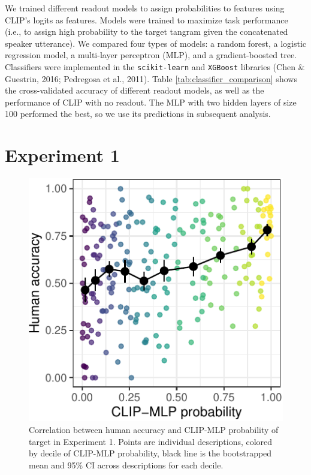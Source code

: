 \documentclass[10pt, letterpaper]{article}
\begin{document}
We trained different readout models to assign probabilities to features
using CLIP's logits as features. Models were trained to maximize task
performance (i.e., to assign high probability to the target tangram
given the concatenated speaker utterance). We compared four types of
models: a random forest, a logistic regression model, a multi-layer
perceptron (MLP), and a gradient-boosted tree. Classifiers were
implemented in the \texttt{scikit-learn} and \texttt{XGBoost} libraries
(Chen \& Guestrin, 2016; Pedregosa et al., 2011). Table
\ref{tab:classifier_comparison} shows the cross-validated accuracy of
different readout models, as well as the performance of CLIP with no
readout. The MLP with two hidden layers of size 100 performed the best,
so we use its predictions in subsequent analysis.

\section{Experiment 1}\label{experiment-1}

\begin{CodeChunk}
\begin{figure}[t]

{\centering \includegraphics[width=0.7\linewidth]{figs/fig-calibration-1} 

}

\caption[Correlation between human accuracy and CLIP-MLP probability of target in Experiment 1]{Correlation between human accuracy and CLIP-MLP probability of target in Experiment 1.  Points are individual descriptions, colored by decile of CLIP-MLP probability, black line is the bootstrapped mean and 95\% CI across descriptions for each decile. \label{calibration}}\label{fig:fig-calibration}
\end{figure}
\end{CodeChunk}
\end{document}
